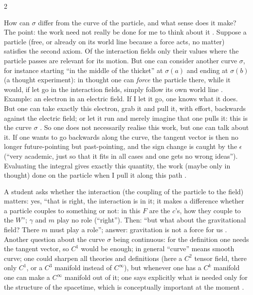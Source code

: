 \begin{paracol}{2}
\begin{intuition}\label{int:nd-work}
How can $\sigma$ differ from the curve of the particle, and what sense does it make? The point: the work need not really be done for me to think about it . Suppose a particle (free, or already on its world line because a force acts, no matter) satisfies the second axiom. Of the interaction fields only their values where the particle passes are relevant for its motion.
But one can consider another curve $\sigma$, for instance starting ``in the middle of the thicket'' at $\sigma(a)$ and ending at $\sigma(b)$ (a thought experiment): in thought one can \emph{force} the particle there, while it would, if let go in the interaction fields, simply follow its own world line . Example: an electron in an electric field. If I let it go, one knows what it does.
But one can take exactly this electron, grab it and pull it, with effort, backwards against the electric field; or let it run and merely imagine that one pulls it: this is the curve $\sigma$ . So one does not necessarily realise this work, but one can talk about it. If one wants to go backwards along the curve, the tangent vector is then no longer future-pointing but past-pointing, and the
sign change is caught by the $\epsilon$ (``very academic, just so that it fits in all cases and one gets no wrong ideas''). Evaluating the integral gives exactly this quantity, the work (maybe only in thought) done on the particle when I pull it along this path .
\end{intuition}
\begin{coursenote}
A student asks whether the interaction (the coupling of the particle to the field) matters: yes, ``that is right, the interaction is in it; it makes a difference whether a particle couples to something or not: in this $F$ are the $c$'s, how they couple to the $W$''; $\gamma$ and $m$ play no role (``right''). Then: ``but what about the gravitational field? There $m$ must play a role'';
answer: gravitation is not a force for us . Another question about the curve $\sigma$ being continuous: for the definition one needs the tangent vector, so $C^1$ would be enough; in general ``curve'' means smooth curve; one could sharpen all theories and definitions (here a $C^2$ tensor field, there only $C^1$, or a $C^3$ manifold instead of $C^\infty$), but whenever one has a $C^k$ manifold one can make
a $C^\infty$ manifold out of it; one says explicitly what is needed only for the structure of the spacetime, which is conceptually important at the moment .
\end{coursenote}


\end{paracol}
